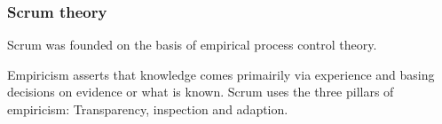 \subsubsection{Scrum theory}

Scrum was founded on the basis of empirical process control theory\cite{scrumguide11}.

Empiricism asserts that knowledge comes primairily via experience and basing 
decisions on evidence or what is known. Scrum uses the three pillars of 
empiricism: Transparency, inspection and adaption\cite{scrumguide11}.




